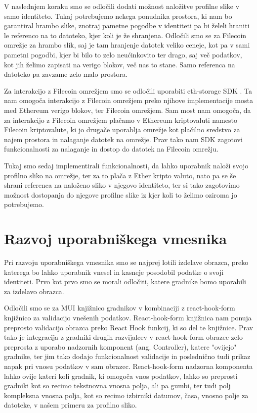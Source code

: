 \documentclass[a4paper,12pt,openright]{book}
\begin{document}
V naslednjem koraku smo se odločili dodati možnost naložitve profilne slike v samo identiteto.
Tukaj potrebujemo nekega ponudnika prostora, ki nam bo garantiral hrambo slike, znotraj pametne pogodbe v identiteti pa bi želeli hraniti le referenco na to datoteko, kjer koli je že shranjena.
Odločili smo se za Filecoin omrežje za hrambo slik, saj je tam hranjenje datotek veliko ceneje, kot pa v sami pametni pogodbi, kjer bi bilo to zelo neućinkovito ter drago, saj več podatkov, kot jih želimo zapisati na verigo blokov, več nas to stane.
Samo referenca na datoteko pa zavzame zelo malo prostora.

Za interakcijo z Filecoin omrežjem smo se odločili uporabiti eth-storage SDK \cite{textile_storage_gh}.
Ta nam omogoča interakcijo z Filecoin omrežjem preko njihove implementacije mosta med Ethereum verigo blokov, ter Filecoin omrežjem.
Sam most nam omogoča, da za interakcijo z Filecoin omrežjem plačamo v Ethereum kriptovaluti namesto Filecoin kriptovalute, ki jo drugače uporablja omrežje kot plačilno sredstvo za najem prostora in nalaganje datotek na omrežje.
Prav tako nam SDK zagotovi funkcionalnosti za nalaganje in dostop do datotek na Filecoin omrežju.

Tukaj smo sedaj implementirali funkcionalnosti, da lahko uporabnik naloži svojo profilno sliko na omrežje, ter za to plača z Ether kripto valuto, nato pa se še shrani referenca na naloženo sliko v njegovo identiteto, ter si tako zagotovimo možnost dostopanja do njegove profilne slike iz kjer koli to želimo oziroma jo potrebujemo. 


\section{Razvoj uporabniškega vmesnika}
Pri razvoju uporabniškega vmesnika smo se najprej lotili izdelave obrazca, preko katerega bo lahko uporabnik vnesel in kasneje posodobil podatke o svoji identiteti.
Prvo kot prvo smo se morali odločiti, katere gradnike bomo uporabili za izdelavo obrazca.

Odločili smo se za MUI knjižnico gradnikov \cite{mui} v kombinaciji z react-hook-form knjižnico \cite{react_hook_form} za validacijo vnešenih podatkov.
React-hook-form knjižnica nam ponuja preprosto validacijo obrazca preko React Hook funkcij, ki so del te knjižnice.
Prav tako je integracija z gradniki drugih razvijalcev v react-hook-form obrazec zelo preprosta z uporabo nadzornih komponent (ang. Controller),
katere "ovijejo" gradnike, ter jim tako dodajo funkcionalnost validacije in poslednično tudi prikaz napak pri vnosu podatkov v sam obrazec.
React-hook-form nadzorna komponenta lahko ovije kateri koli gradnik, ki omogoča vnos podatkov, lahko so preprosti gradniki kot so recimo
tekstnovna vnosna polja, ali pa gumbi, ter tudi polj kompleksna vnosna polja, kot so recimo izbirniki datumov, časa, vnosno polje za datoteke,
v našem primeru za profilno sliko.
\end{document}
